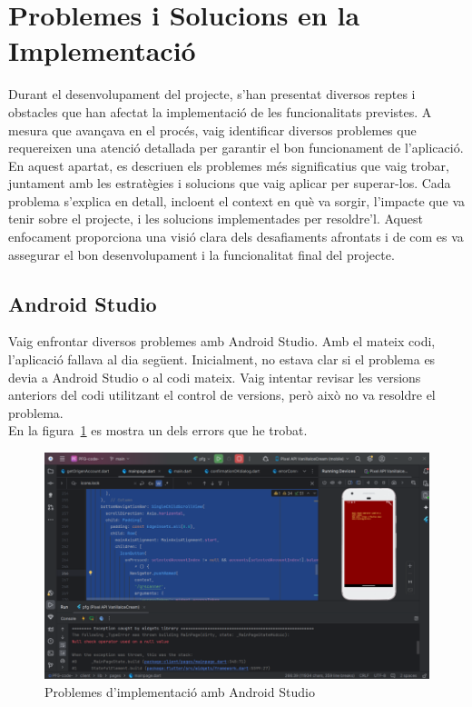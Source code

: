 \documentclass[a4paper,12pt,twoside]{ThesisStyle}
\begin{document}
\section{Problemes i Solucions en la Implementació}
\label{sec:Problemes i Solucions en la Implementació}

Durant el desenvolupament del projecte, s'han presentat diversos reptes i obstacles que han afectat la implementació de les funcionalitats previstes. A mesura que avançava en el procés, vaig identificar diversos problemes que requereixen una atenció detallada per garantir el bon funcionament de l'aplicació.\\

En aquest apartat, es descriuen els problemes més significatius que vaig trobar, juntament amb les estratègies i solucions que vaig aplicar per superar-los. Cada problema s'explica en detall, incloent el context en què va sorgir, l'impacte que va tenir sobre el projecte, i les solucions implementades per resoldre'l. Aquest enfocament proporciona una visió clara dels desafiaments afrontats i de com es va assegurar el bon desenvolupament i la funcionalitat final del projecte.\\


\subsection{Android Studio}
\label{subsec: Android Studio}

Vaig enfrontar diversos problemes amb Android Studio. Amb el mateix codi, l'aplicació fallava al dia següent. Inicialment, no estava clar si el problema es devia a Android Studio o al codi mateix. Vaig intentar revisar les versions anteriors del codi utilitzant el control de versions, però això no va resoldre el problema.\\

En la figura~\ref{fig:Problemes d'implementació amb Android Studio} es mostra un dels errors que he trobat.

\begin{figure}[h]
    \centering
    \includegraphics[width=1\textwidth]{imatges/errorAndroid.png}
    \caption{Problemes d'implementació amb Android Studio}
    \label{fig:Problemes d'implementació amb Android Studio}
\end{figure}
\end{document}
